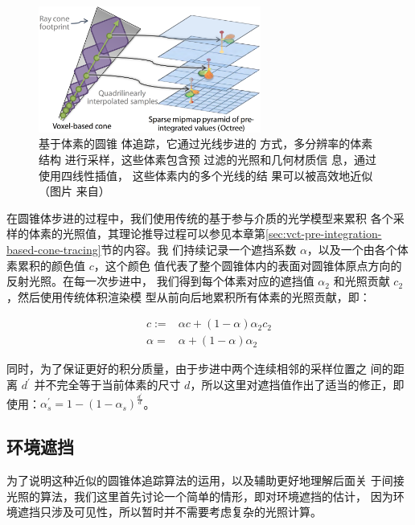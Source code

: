 \begin{figure}
	\sidecaption
	\includegraphics[width=0.65\textwidth]{figures/vct/vct-7-4}
	\caption{基于体素的圆锥 体追踪，它通过光线步进的 方式，多分辨率的体素结构 进行采样，这些体素包含预 过滤的光照和几何材质信 息，通过使用四线性插值， 这些体素内的多个光线的结 果可以被高效地近似（图片 来自\cite{a:Gigavoxels:Avoxelbasedrenderingpipelineforefficientexplorationoflargeanddetailedscenes}）}
	\label{f:vct-cone-tracing}
\end{figure}

在圆锥体步进的过程中，我们使用传统的基于参与介质的光学模型来累积 各个采样的体素的光照值，其理论推导过程可以参见本章第\ref{sec:vct-pre-integration-based-cone-tracing}节的内容。我 们持续记录一个遮挡系数 $\alpha$，以及一个由各个体素累积的颜色值 $c$，这个颜色 值代表了整个圆锥体内的表面对圆锥体原点方向的反射光照。在每一次步进中， 我们得到每个体素对应的遮挡值 $\alpha_2$ 和光照贡献 $c_2$，然后使用传统体积渲染模 型从前向后地累积所有体素的光照贡献，即：

\begin{equation}
\begin{aligned}
	c:=&\alpha c+(1-\alpha)\alpha_2c_2\\
	\alpha=&\alpha+(1-\alpha)\alpha_2
\end{aligned}
\end{equation}

同时，为了保证更好的积分质量，由于步进中两个连续相邻的采样位置之 间的距离 $d^{'}$ 并不完全等于当前体素的尺寸 $d$，所以这里对遮挡值作出了适当的修正，即使用：$\alpha^{'}_s=1-(1-\alpha_s)^{\frac{d^{'}}{d}}$。



\subsection{环境遮挡}
为了说明这种近似的圆锥体追踪算法的运用，以及辅助更好地理解后面关 于间接光照的算法，我们这里首先讨论一个简单的情形，即对环境遮挡的估计， 因为环境遮挡只涉及可见性，所以暂时并不需要考虑复杂的光照计算。

